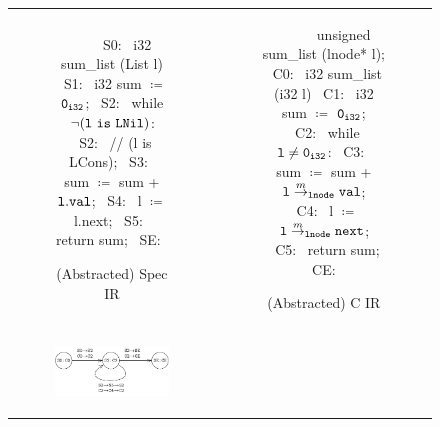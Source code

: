 \begin{figure}[H]
\begin{tabular}{cc}
\begin{subfigure}[b]{0.45\textwidth}
\begin{center}
\begin{allLangEnvScript}
~{\scriptsize \textcolor{mygray}{   }}~   
~{\scriptsize \textcolor{mygray}{S0:}}~ i32 sum_list (List l) {
~{\scriptsize \textcolor{mygray}{S1:}}~   i32 sum $\coloneqq$ ${\tt 0_{i32}}$;
~{\scriptsize \textcolor{mygray}{S2:}}~   while $\mathrm{\tt\neg (l\ is\ LNil)}$:
~{\scriptsize \textcolor{mygray}{S2:}}~     // (l is LCons);
~{\scriptsize \textcolor{mygray}{S3:}}~     sum $\coloneqq$ sum + ${\tt l.val}$;
~{\scriptsize \textcolor{mygray}{S4:}}~     l   $\coloneqq$ l.next;
~{\scriptsize \textcolor{mygray}{S5:}}~   return sum;
~{\scriptsize \textcolor{mygray}{SE:}}~ }
\end{allLangEnvScript}
\end{center}
\vspace{-15px}
\caption{\label{fig:llTraverseSpec}(Abstracted) Spec IR}
\end{subfigure}%
&
\begin{subfigure}[b]{0.55\textwidth}
\begin{center}
\begin{allLangEnvScript}
~{\scriptsize \textcolor{mygray}{\ \ \ }}~ unsigned sum_list (lnode* l);
~{\scriptsize \textcolor{mygray}{C0:}}~ i32 sum_list (i32 l) {
~{\scriptsize \textcolor{mygray}{C1:}}~   i32 sum $\coloneqq$ ${\tt 0_{i32}}$;
~{\scriptsize \textcolor{mygray}{C2:}}~   while ${\tt l \neq 0_{i32}}$:
~{\scriptsize \textcolor{mygray}{C3:}}~     sum $\coloneqq$ sum + ${\tt \tt l} \overset{m}{\rightarrow}_{\tt lnode} {\tt val}$;
~{\scriptsize \textcolor{mygray}{C4:}}~     l   $\coloneqq$ ${\tt \tt l} \overset{m}{\rightarrow}_{\tt lnode} {\tt next}$;
~{\scriptsize \textcolor{mygray}{C5:}}~   return sum;
~{\scriptsize \textcolor{mygray}{CE:}}~ }
\end{allLangEnvScript}
\end{center}
\vspace{-15px}
\caption{\label{fig:llTraverseC}(Abstracted) C IR}
\end{subfigure}%
\\
\begin{subfigure}[b]{0.50\textwidth}
\begin{center}
{\includegraphics[scale=1.2]{chapters/figures/figSumListProductCfg.pdf}}

\end{center}
\end{subfigure}
\end{tabular}
\end{figure}
